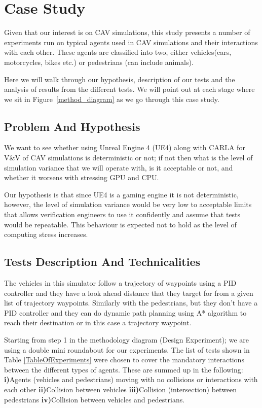\section{Case Study} \label{s:case-study}
Given that our interest is on CAV simulations, this study presents a number of experiments run on typical agents used in CAV simulations and their interactions with each other. These agents are classified into two, either vehicles(cars, motorcycles, bikes etc.) or pedestrians (can include animals).

Here we will walk through our hypothesis, description of our tests and the analysis of results from the different tests. We will point out at each stage where we sit in Figure~\ref{method_diagram} as we go through this case study.    

\subsection{Problem And Hypothesis}
We want to see whether using Unreal Engine 4 (UE4) along with CARLA \cite{CARLA_paper} for V\&V of CAV simulations is deterministic or not; if not then what is the level of simulation variance that we will operate with, is it acceptable or not, and whether it worsens with stressing GPU and CPU.

Our hypothesis is that since UE4 is a gaming engine it is not deterministic, however, the level of simulation variance would be very low to acceptable limits that allows verification engineers to use it confidently and assume that tests would be repeatable.
This behaviour is expected not to hold as the level of computing stress increases.     

\subsection{Tests Description And Technicalities}\label{TestsDescriptionAndTechnicalities}
The vehicles in this simulator follow a trajectory of waypoints using a PID controller and they have a look ahead distance that they target for from a given list of trajectory waypoints. 
Similarly with the pedestrians, but they don't have a PID controller and they can do dynamic path planning using A* algorithm to reach their destination or in this case a trajectory waypoint.

Starting from step 1 in the methodology diagram (Design Experiment); we are using a double mini roundabout for our experiments. 
The list of tests shown in Table \ref{TableOfExperiments} were chosen to cover the mandatory interactions between the different types of agents. 
These are summed up in the following: \textbf{i)}Agents (vehicles and pedestrians) moving with no collisions or interactions with each other \textbf{ii)}Collision between vehicles \textbf{iii)}Collision (intersection) between pedestrians \textbf{iv)}Collision between vehicles and pedestrians.

